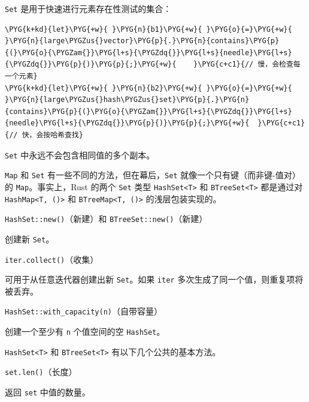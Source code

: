 \texttt{Set} 是用于快速进行元素存在性测试的集合：

\begin{Verbatim}[commandchars=\\\{\},breaklines=true,breakanywhere=true,fontsize=\codefont,xleftmargin=17bp]
\PYG{k+kd}{let}\PYG{+w}{ }\PYG{n}{b1}\PYG{+w}{ }\PYG{o}{=}\PYG{+w}{ }\PYG{n}{large\PYGZus{}vector}\PYG{p}{.}\PYG{n}{contains}\PYG{p}{(}\PYG{o}{\PYGZam{}}\PYG{l+s}{\PYGZdq{}}\PYG{l+s}{needle}\PYG{l+s}{\PYGZdq{}}\PYG{p}{)}\PYG{p}{;}\PYG{+w}{    }\PYG{c+c1}{// 慢，会检查每一个元素}
\PYG{k+kd}{let}\PYG{+w}{ }\PYG{n}{b2}\PYG{+w}{ }\PYG{o}{=}\PYG{+w}{ }\PYG{n}{large\PYGZus{}hash\PYGZus{}set}\PYG{p}{.}\PYG{n}{contains}\PYG{p}{(}\PYG{o}{\PYGZam{}}\PYG{l+s}{\PYGZdq{}}\PYG{l+s}{needle}\PYG{l+s}{\PYGZdq{}}\PYG{p}{)}\PYG{p}{;}\PYG{+w}{  }\PYG{c+c1}{// 快，会按哈希查找}
\end{Verbatim}

\texttt{Set} 中永远不会包含相同值的多个副本。

\texttt{Map} 和 \texttt{Set} 有一些不同的方法，但在幕后，\texttt{Set} 就像一个只有键（而非键-值对）的 \texttt{Map}。事实上，Rust 的两个 \texttt{Set} 类型 \texttt{HashSet<T>} 和 \texttt{BTreeSet<T>} 都是通过对 \texttt{HashMap<T, ()>} 和 \texttt{BTreeMap<T, ()>} 的浅层包装实现的。

\begin{myNote}
\texttt{HashSet::new()}（新建）和 \texttt{BTreeSet::new()}（新建）
\end{myNote}

创建新 \texttt{Set}。

\begin{mySidenote}
\texttt{iter.collect()}（收集）
\end{mySidenote}

可用于从任意迭代器创建出新 \texttt{Set}。如果 \texttt{iter} 多次生成了同一个值，则重复项将被丢弃。

\begin{myNote}
\texttt{HashSet::with\_capacity(n)}（自带容量）
\end{myNote}

创建一个至少有 \texttt{n} 个值空间的空 \texttt{HashSet}。

\texttt{HashSet<T>} 和 \texttt{BTreeSet<T>} 有以下几个公共的基本方法。

\begin{mySidenote}
\texttt{set.len()}（长度）
\end{mySidenote}

返回 \texttt{set} 中值的数量。

